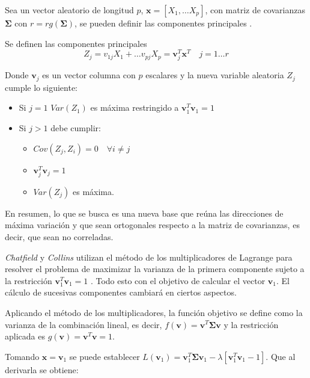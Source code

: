 \noindent Sea un vector aleatorio de longitud $p$, $\mathbf{x}=[X_1,\ldots X_p]$, con matriz de covarianzas $\mathbf{\Sigma}$ con $r=rg(\mathbf{\Sigma})$, se pueden definir las componentes principales \cite{Cuadras 2014}.
\begin{defi}
Se definen las componentes principales 
\begin{equation}
Z_j=v_{1j}X_1+\ldots v_{pj}X_p=\mathbf{v}_j^T\mathbf{x}^T \quad j=1\ldots r
\end{equation}

\noindent Donde $\textbf{v}_j$ es un vector columna con $p$ escalares y la nueva variable aleatoria $Z_j$ cumple lo siguiente:
\begin{itemize}
\item Si $j=1$ $Var(Z_1)$ es máxima restringido a $\mathbf{v}_1^T \mathbf{v}_1=1$
\item Si $j>1$ debe cumplir:
\begin{itemize}
\item $Cov(Z_j,Z_i)=0\quad \forall i\neq j $
\item $\textbf{v}_j^T \textbf{v}_j=1$
\item $Var(Z_j)$ es máxima. 
\end{itemize}
\end{itemize}
\noindent En resumen, lo que se busca es una nueva base que reúna las direcciones de máxima variación y que sean ortogonales respecto a la matriz de covarianzas, es decir, que sean no correladas.

\end{defi}

\noindent \emph{Chatfield} y \emph{Collins}  utilizan el método de los multiplicadores de Lagrange para resolver el problema de maximizar  la varianza de la primera componente sujeto a la restricción $\textbf{v}_1^T\textbf{v}_1=1$ \cite{Chatfield 1989}. Todo esto con el objetivo de calcular el vector $\mathbf{v}_1$. El cálculo de sucesivas componentes cambiará en ciertos aspectos. 

\noindent Aplicando el método de los multiplicadores, la función objetivo se define como la varianza de la combinación lineal, es decir, $f(\mathbf{v})=\mathbf{v}^T \mathbf{\Sigma} \mathbf{v}$ y la restricción aplicada es $g(\textbf{v})=\textbf{v}^T\textbf{v}=1$. 

\noindent Tomando $\textbf{x}=\textbf{v}_1$ se puede establecer $L(\textbf{v}_1)=\textbf{v}_1^T \mathbf{\Sigma} \textbf{v}_1 - \lambda[\textbf{v}_1^T \textbf{v}_1-1]$. Que al derivarla se obtiene:

